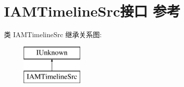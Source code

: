 \hypertarget{interface_i_a_m_timeline_src}{}\section{I\+A\+M\+Timeline\+Src接口 参考}
\label{interface_i_a_m_timeline_src}
类 I\+A\+M\+Timeline\+Src 继承关系图\+:\begin{figure}[H]
\begin{center}
\leavevmode
\includegraphics[height=2.000000cm]{interface_i_a_m_timeline_src}
\end{center}
\end{figure}
